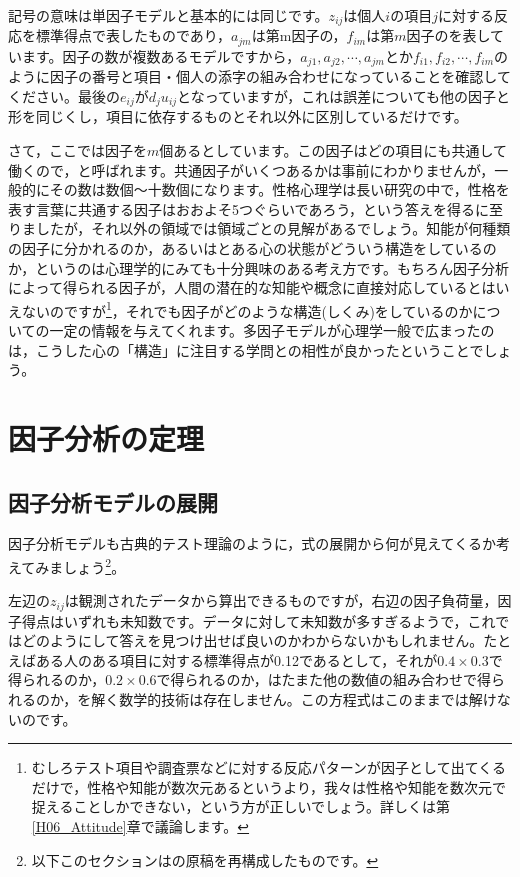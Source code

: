 \documentclass{ltjsbook}
\begin{document}
記号の意味は単因子モデルと基本的には同じです。$z_{ij}$は個人$i$の項目$j$に対する反応を標準得点で表したものであり，$a_{jm}$は第m因子の，$f_{im}$は第$m$因子のを表しています。因子の数が複数あるモデルですから，$a_{j1},a_{j2},\cdots, a_{jm}$とか$f_{i1},f_{i2},\cdots, f_{im}$のように因子の番号と項目・個人の添字の組み合わせになっていることを確認してください。最後の$e_{ij}$が$d_j u_{ij}$となっていますが，これは誤差についても他の因子と形を同じくし，項目に依存するものとそれ以外に区別しているだけです。

さて，ここでは因子を$m$個あるとしています。この因子はどの項目にも共通して働くので，と呼ばれます。共通因子がいくつあるかは事前にわかりませんが，一般的にその数は数個〜十数個になります。性格心理学は長い研究の中で，性格を表す言葉に共通する因子はおおよそ5つぐらいであろう，という答えを得るに至りましたが，それ以外の領域では領域ごとの見解があるでしょう。知能が何種類の因子に分かれるのか，あるいはとある心の状態がどういう構造をしているのか，というのは心理学的にみても十分興味のある考え方です。もちろん因子分析によって得られる因子が，人間の潜在的な知能や概念に直接対応しているとはいえないのですが\footnote{むしろテスト項目や調査票などに対する反応パターンが因子として出てくるだけで，性格や知能が数次元あるというより，我々は性格や知能を数次元で捉えることしかできない，という方が正しいでしょう。詳しくは第\ref{H06_Attitude}章で議論します。}，それでも因子がどのような構造(しくみ)をしているのかについての一定の情報を与えてくれます。多因子モデルが心理学一般で広まったのは，こうした心の「構造」に注目する学問との相性が良かったということでしょう。

\section{因子分析の定理}
\subsection{因子分析モデルの展開}
因子分析モデルも古典的テスト理論のように，式の展開から何が見えてくるか考えてみましょう\footnote{以下このセクションは\citet{kosugi2018}の原稿を再構成したものです。}。

左辺の$z_{ij}$は観測されたデータから算出できるものですが，右辺の因子負荷量，因子得点はいずれも未知数です。データに対して未知数が多すぎるようで，これではどのようにして答えを見つけ出せば良いのかわからないかもしれません。たとえばある人のある項目に対する標準得点が0.12であるとして，それが$0.4 \times 0.3$で得られるのか，$0.2 \times 0.6$で得られるのか，はたまた他の数値の組み合わせで得られるのか，を解く数学的技術は存在しません。この方程式はこのままでは解けないのです。
\end{document}
